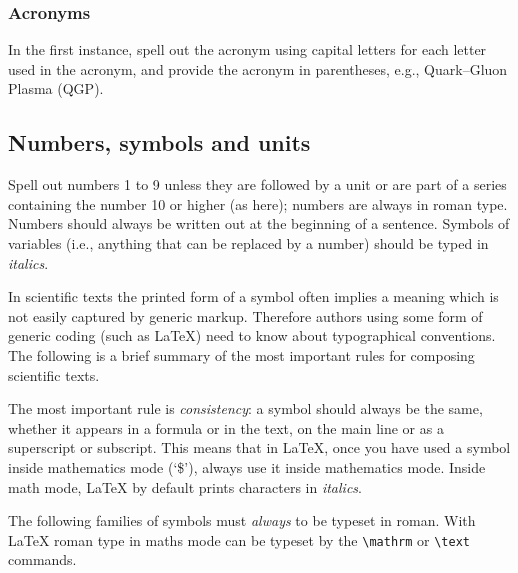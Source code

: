 \documentclass{cernphprep}
\providecommand*\eg{e.g.,\xspace}
\providecommand*\ie{i.e.,\xspace}
\begin{document}
\subsubsection{Acronyms}

In the first instance, spell out the acronym using capital letters for
each letter used in the acronym, and provide the acronym in
parentheses, \eg Quark--Gluon Plasma (QGP).

\subsection{Numbers, symbols and units}
\label{sec:numberssymbolsunits}

Spell out numbers 1 to 9 unless they are followed by a unit or are
part of a series containing the number 10 or higher (as here); numbers
are always in roman type. Numbers should always be written out at the
beginning of a sentence.  Symbols of variables (\ie anything that can
be replaced by a number) should be typed in \emph{italics}.

In scientific texts the printed form of a symbol often implies a
meaning which is not easily captured by generic markup.  Therefore
authors using some form of generic coding (such as \LaTeX) need
to know about typographical conventions.  The following is a brief
summary of the most important rules for composing scientific
texts\cite{bib:iso31,bib:iupap,bib:bipm,bib:nist}.
 
The most important rule is \emph{consistency}: a symbol should always
be the same, whether it appears in a formula or in the text, on the
main line or as a superscript or subscript.  This means that in
\LaTeX, once you have used a symbol inside mathematics mode (`\$'),
always use it inside mathematics mode.  Inside math mode, \LaTeX{} by
default prints characters in \emph{italics}.

The following families of symbols must \emph{always} to be typeset in
roman. With \LaTeX{} roman type in maths mode can be typeset by the
\verb!\mathrm! or \verb!\text! commands.
\end{document}
